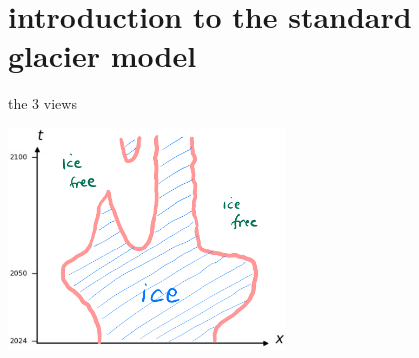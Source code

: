 \documentclass[10pt,dvipsnames]{beamer}
\begin{document}
\AtBeginSection[]
{%
}

\section{introduction to the standard glacier model}

\begin{frame}{the 3 views}

\vspace{-2mm}
\begin{center}
\includegraphics[width=0.55\textwidth]{xtcrop}
\end{center}


\end{frame}
\end{document}
